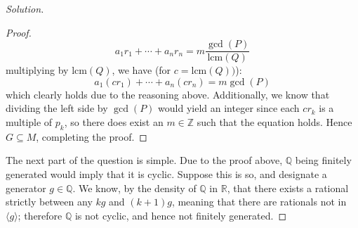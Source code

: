 \documentclass[12pt]{article}
\newcommand{\lcm}[1]{\text{lcm}(#1)}
\newenvironment{solution}
  {\renewcommand\qedsymbol{$\blacksquare$}\begin{proof}[Solution]}
{\end{proof}}
\newenvironment{sproof}{
  \renewcommand\qedsymbol{$\square$}
  \begin{proof}
  }{
  \end{proof}
}
\begin{document}
\begin{solution}
\begin{sproof}
    \begin{equation*}
      a_1r_1+\cdots+a_nr_n = m\frac{\gcd(P)}{\lcm{Q}}
    \end{equation*}
  multiplying by $\lcm{Q}$, we have (for $c=\lcm{Q})$):
    \begin{equation*}
      a_1(cr_1) + \cdots + a_n(cr_n) = m\gcd(P)
    \end{equation*}
    which clearly holds due to the reasoning above. 
    Additionally, we know that dividing the left side by $\gcd(P)$ would yield an integer since
    each $cr_k$ is a multiple of $p_k$, so there does exist an $m\in\mathbb{Z}$ such that the equation holds.
    Hence $G \subseteq M$, completing the proof.
  \end{sproof}
  The next part of the question is simple.
  Due to the proof above, $\mathbb{Q}$ being finitely generated would imply that it is cyclic.
  Suppose this is so, and designate a generator $g\in\mathbb{Q}$.
  We know, by the density of $\mathbb{Q}$ in $\mathbb{R}$,
  that there exists a rational strictly between any $kg$ and $(k+1)g$,
  meaning that there are rationals not in $\langle g\rangle$; therefore $\mathbb{Q}$ is not cyclic, and hence
  not finitely generated.
\end{solution}
\end{document}
